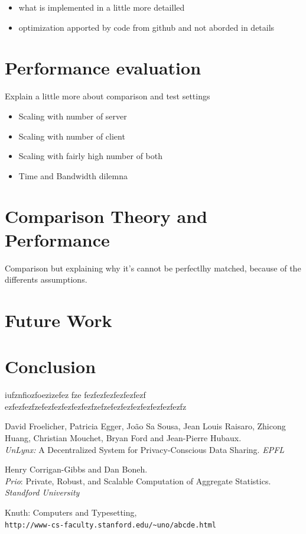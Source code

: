 \documentclass{article}
\begin{document}
\begin{itemize}

\item what is implemented in a little more detailled
\item optimization apported by code from github and not aborded in details

\end{itemize}


\section{Performance evaluation}

Explain a little more about comparison and test settings


\begin{itemize}


\item Scaling with number of server
\item Scaling with number of client
\item Scaling with fairly high number of both 
\item Time and Bandwidth dilemna

\end{itemize}


\section{Comparison Theory and Performance}
Comparison but explaining why it's cannot be perfectlhy matched, because of the differents assumptions.

\section{Future Work}

\newpage
\section*{Conclusion}
iufznfiozfoezizefez fze
fezfezfezfezfezfezf
ezfezfezfzefezfezfezfezfezfzefzefezfezfezfezfezfezfezfz

\newpage
\begin{thebibliography}{9}

David Froelicher, Patricia Egger, João Sa Sousa, Jean Louis Raisaro, Zhicong Huang, Christian Mouchet, Bryan Ford and Jean-Pierre Hubaux.\\
\textit{UnLynx:} A Decentralized System for Privacy-Conscious Data Sharing. 
\textit{EPFL}
 
Henry Corrigan-Gibbs and Dan Boneh.\\
\textit{Prio}: Private, Robust, and Scalable Computation of Aggregate Statistics.
\textit{Standford University}


Knuth: Computers and Typesetting,
\\\texttt{http://www-cs-faculty.stanford.edu/\~{}uno/abcde.html}
\end{thebibliography}

\bibitem{}
\end{document}
